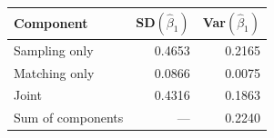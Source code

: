 \begin{tabular}{lrr}
\toprule
Component & SD$(\hat\beta_1)$ & Var$(\hat\beta_1)$ \\
\midrule
Sampling only & 0.4653 & 0.2165 \\
Matching only & 0.0866 & 0.0075 \\
Joint & 0.4316 & 0.1863 \\
Sum of components & --- & 0.2240 \\
\bottomrule
\end{tabular}
